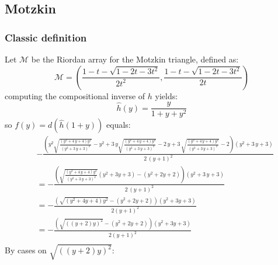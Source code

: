 \documentclass[11pt,a4paper]{article} %
\begin{document}
    \subsection{Motzkin}

    \subsubsection{Classic definition}

    Let $\mathcal{M}$ be the Riordan array for the 
    Motzkin triangle, defined as:
    \begin{displaymath} 
        \mathcal{M} =\left( \frac{1-t-\sqrt{1-2t-3t^2}}{2t^2},
           \frac{1-t-\sqrt{1-2t-3t^2}}{2t}  \right)
    \end{displaymath} 
    computing the compositional inverse of $h$ yields:
    \begin{displaymath} 
        \hat{h}(y) = \frac{y}{1+y+y^2}
    \end{displaymath} 
    so $f(y)=d(\hat{h}(1+y))$ equals:
    \begin{displaymath} 
        \begin{split} 
            & -\frac{{\left(y^{2} \sqrt{\frac{{\left(y^{2} + 4 \, y + 4\right)} y^{2}}{{\left(y^{2} + 3 \, y + 3\right)}^{2}}} - y^{2} + 3 \, y \sqrt{\frac{{\left(y^{2} + 4 \, y + 4\right)} y^{2}}{{\left(y^{2} + 3 \, y + 3\right)}^{2}}} - 2 \, y + 3 \, \sqrt{\frac{{\left(y^{2} + 4 \, y + 4\right)} y^{2}}{{\left(y^{2} + 3 \, y + 3\right)}^{2}}} - 2\right)} {\left(y^{2} + 3 \, y + 3\right)}}{2 \, {\left(y + 1\right)}^{2}} \\
            & = -\frac{{ \left(\sqrt{\frac{{\left(y^{2} + 4 \, y + 4\right)} y^{2}}{{\left(y^{2} + 3 \, y + 3\right)}^{2}}} \left( y^{2}+3y+3 \right) -\left(y^{2}+2y+2\right)\right){\left(y^{2} + 3 \, y + 3\right)}}}{2 \, {\left(y + 1\right)}^{2}} \\
            & = -\frac{ \left(\sqrt{\left(y^{2} + 4 y + 4\right) y^{2}} -\left(y^{2}+2y+2\right)\right)\left(y^{2} + 3y + 3\right)}{2 {\left(y + 1\right)}^{2}} \\
            & = -\frac{ \left(\sqrt{\left(\left(y + 2\right) y\right)^{2}} -\left(y^{2}+2y+2\right)\right)\left(y^{2} + 3y + 3\right)}{2 {\left(y + 1\right)}^{2}} \\
        \end{split} 
    \end{displaymath} 
    By cases on $\sqrt{\left(\left(y + 2\right) y\right)^{2}}$:
\end{document}
